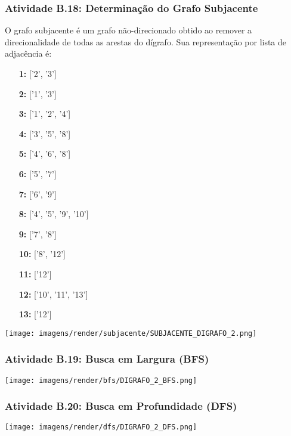 \documentclass[a4paper,12pt]{article}
\begin{document}
\subsubsection*{Atividade B.18: Determinação do Grafo Subjacente}
O grafo subjacente é um grafo não-direcionado obtido ao remover a direcionalidade de todas as arestas do dígrafo. Sua representação por lista de adjacência é:
\begin{itemize}[leftmargin=*]
    \item[\textbf{1:}] ['2', '3']
    \item[\textbf{2:}] ['1', '3']
    \item[\textbf{3:}] ['1', '2', '4']
    \item[\textbf{4:}] ['3', '5', '8']
    \item[\textbf{5:}] ['4', '6', '8']
    \item[\textbf{6:}] ['5', '7']
    \item[\textbf{7:}] ['6', '9']
    \item[\textbf{8:}] ['4', '5', '9', '10']
    \item[\textbf{9:}] ['7', '8']
    \item[\textbf{10:}] ['8', '12']
    \item[\textbf{11:}] ['12']
    \item[\textbf{12:}] ['10', '11', '13']
    \item[\textbf{13:}] ['12']
\end{itemize}

\begin{center}
    \texttt{[image: imagens/render/subjacente/SUBJACENTE\_DIGRAFO\_2.png]}
\end{center}

\subsubsection*{Atividade B.19: Busca em Largura (BFS)}
\begin{center}
    \texttt{[image: imagens/render/bfs/DIGRAFO\_2\_BFS.png]}
\end{center}

\subsubsection*{Atividade B.20: Busca em Profundidade (DFS)}
\begin{center}
    \texttt{[image: imagens/render/dfs/DIGRAFO\_2\_DFS.png]}
\end{center}
\\
\end{document}
